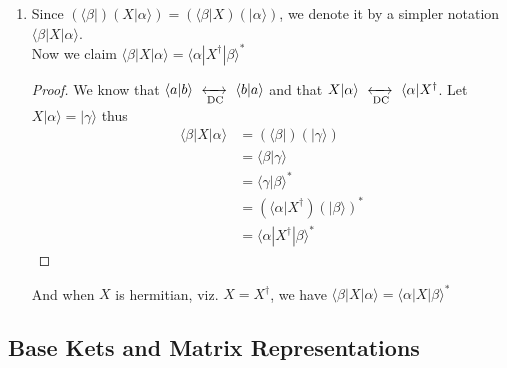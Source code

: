 \documentclass[12pt]{article}
\def\dc{\,\,\xleftrightarrow[\text{DC}]{}\,\,}
\def\bra#1{\langle#1|}
\def\ket#1{|#1 \rangle}
\def\inpr#1#2{\langle #1|#2 \rangle}
\def\braket#1#2#3{\langle#1|#2|#3\rangle}
\def\ha#1{#1^\dagger}
\begin{document}
\begin{enumerate}
\begin{enumerate}
						\end{enumerate}
					\item Since $(\bra \beta ) (X \ket \alpha ) = (\bra \beta X ) (\ket \alpha)$, we denote it by a simpler notation $\braket \beta X \alpha$.\\
					Now we claim $\braket \beta X \alpha = \braket \alpha {\ha X} \beta ^*$
					\begin{proof}
						We know that $\inpr a b \dc \inpr b a$ and that $X \ket \alpha \dc \bra \alpha \ha X$. Let $X \ket \alpha = \ket \gamma$ thus
						\begin{align*}
							\braket \beta X \alpha & = (\bra \beta) (\ket \gamma) \\
													& = \inpr \beta \gamma \\
													& = \inpr \gamma \beta ^* \\
													&= (\bra \alpha \ha X) (\ket \beta) ^* \\
													&= \braket \alpha {\ha X} \beta ^*
						\end{align*}
					\end{proof}
					And when $X$ is hermitian, viz. $X=\ha X$, we have $\braket \beta X \alpha = \braket \alpha X \beta ^*$
				\end{enumerate}
		\subsection {Base Kets and Matrix Representations}	
\end{document}
